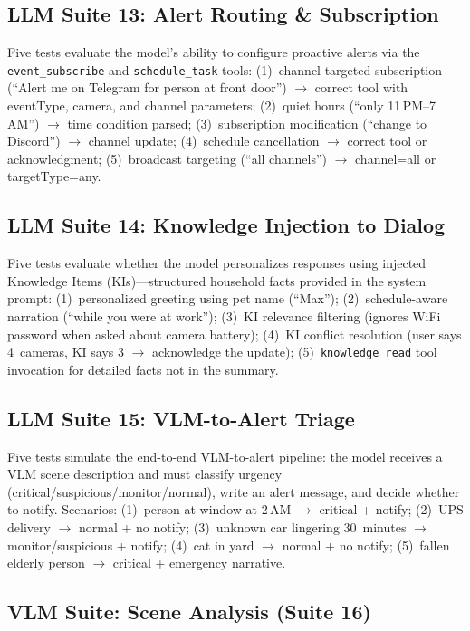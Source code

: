 \documentclass[conference]{IEEEtran}
\begin{document}
\subsection{LLM Suite 13: Alert Routing \& Subscription}

Five tests evaluate the model's ability to configure proactive alerts
via the \texttt{event\_subscribe} and \texttt{schedule\_task} tools:
(1)~channel-targeted subscription (``Alert me on Telegram for person at
front door'') $\rightarrow$ correct tool with eventType, camera, and
channel parameters; (2)~quiet hours (``only 11\,PM--7\,AM'') $\rightarrow$
time condition parsed; (3)~subscription modification (``change to
Discord'') $\rightarrow$ channel update; (4)~schedule cancellation
$\rightarrow$ correct tool or acknowledgment; (5)~broadcast targeting
(``all channels'') $\rightarrow$ channel=all or targetType=any.

\subsection{LLM Suite 14: Knowledge Injection to Dialog}

Five tests evaluate whether the model personalizes responses using
injected Knowledge Items (KIs)---structured household facts provided
in the system prompt: (1)~personalized greeting using pet name (``Max'');
(2)~schedule-aware narration (``while you were at work'');
(3)~KI relevance filtering (ignores WiFi password when asked about camera
battery); (4)~KI conflict resolution (user says 4~cameras, KI says 3
$\rightarrow$ acknowledge the update); (5)~\texttt{knowledge\_read} tool
invocation for detailed facts not in the summary.

\subsection{LLM Suite 15: VLM-to-Alert Triage}

Five tests simulate the end-to-end VLM-to-alert pipeline: the model
receives a VLM scene description and must classify urgency
(critical/suspicious/monitor/normal), write an alert message, and
decide whether to notify. Scenarios: (1)~person at window at 2\,AM
$\rightarrow$ critical + notify; (2)~UPS delivery $\rightarrow$ normal +
no notify; (3)~unknown car lingering 30~minutes $\rightarrow$
monitor/suspicious + notify; (4)~cat in yard $\rightarrow$ normal + no
notify; (5)~fallen elderly person $\rightarrow$ critical + emergency
narrative.

\subsection{VLM Suite: Scene Analysis (Suite 16)}
\end{document}
